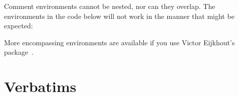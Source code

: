     Comment environments cannot be nested, nor can they overlap. 
The environments in the code below will not work in the manner that might
be expected:

    More encompassing  environments are available if you
use Victor Eijkhout's  package~\cite{COMMENT}.


\section{Verbatims}


